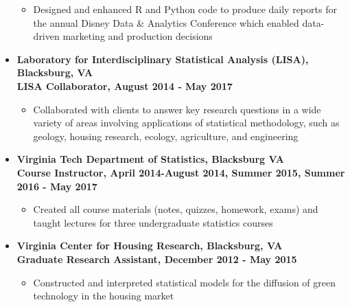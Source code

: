 \documentclass[10pt]{article}
\begin{document}
\begin{itemize}
\begin{itemize}
\item Designed and enhanced R and Python code to produce daily reports for the annual Disney Data \& Analytics Conference which enabled data-driven marketing and production decisions
\end{itemize}

\item[] \textbf{Laboratory for Interdisciplinary Statistical Analysis (LISA), Blacksburg, VA\\
LISA Collaborator, August 2014 - May 2017}
\begin{itemize}
\item Collaborated with clients to answer key research questions in a wide variety of areas involving applications of statistical methodology, such as geology, housing research, ecology, agriculture, and engineering
\end{itemize}


\item[] \textbf{Virginia Tech Department of Statistics, Blacksburg VA\\
Course Instructor, April 2014-August 2014, Summer 2015, Summer 2016 - May 2017}
\begin{itemize}
\item Created all course materials (notes, quizzes, homework, exams) and taught lectures for three undergraduate statistics courses
\end{itemize} 
 
 
\item[] \textbf{Virginia Center for Housing Research, Blacksburg, VA\\
Graduate Research Assistant, December 2012 - May 2015}
\begin{itemize} 
\item Constructed and interpreted statistical models for the diffusion of green technology in the housing market
\end{itemize} 


\end{itemize}
\end{document}
